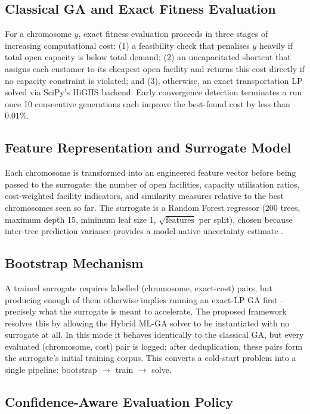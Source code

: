 \documentclass[conference]{IEEEtran}
\begin{document}
\subsection{Classical GA and Exact Fitness Evaluation}

For a chromosome $y$, exact fitness evaluation proceeds in three stages of
increasing computational cost: (1) a feasibility check that penalises $y$
heavily if total open capacity is below total demand; (2) an uncapacitated
shortcut that assigns each customer to its cheapest open facility and returns
this cost directly if no capacity constraint is violated; and (3), otherwise,
an exact transportation LP solved via SciPy's HiGHS backend. Early
convergence detection terminates a run once 10 consecutive generations each
improve the best-found cost by less than $0.01\%$.

\subsection{Feature Representation and Surrogate Model}

Each chromosome is transformed into an engineered feature vector before being
passed to the surrogate: the number of open facilities, capacity utilisation
ratios, cost-weighted facility indicators, and similarity measures relative to
the best chromosomes seen so far. The surrogate is a Random Forest regressor
(200 trees, maximum depth 15, minimum leaf size 1, $\sqrt{\text{features}}$
per split), chosen because inter-tree prediction variance provides a
model-native uncertainty estimate \citep{breiman2001}.

\subsection{Bootstrap Mechanism}

A trained surrogate requires labelled (chromosome, exact-cost) pairs, but
producing enough of them otherwise implies running an exact-LP GA first --
precisely what the surrogate is meant to accelerate. The proposed framework
resolves this by allowing the Hybrid ML-GA solver to be instantiated with no
surrogate at all. In this mode it behaves identically to the classical GA,
but every evaluated (chromosome, cost) pair is logged; after deduplication,
these pairs form the surrogate's initial training corpus. This converts a
cold-start problem into a single pipeline: bootstrap $\rightarrow$ train
$\rightarrow$ solve.

\subsection{Confidence-Aware Evaluation Policy}
\end{document}

